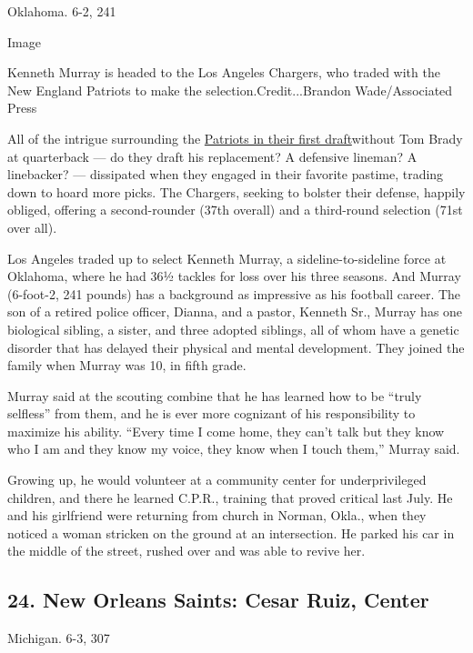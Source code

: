 Oklahoma. 6-2, 241

Image

Kenneth Murray is headed to the Los Angeles Chargers, who traded with
the New England Patriots to make the selection.Credit...Brandon
Wade/Associated Press

All of the intrigue surrounding the
\href{https://www.nytimes3xbfgragh.onion/2020/04/22/sports/football/patriots-nfl-draft-bill-belichick.html}{Patriots
in their first draft}without Tom Brady at quarterback --- do they draft
his replacement? A defensive lineman? A linebacker? --- dissipated when
they engaged in their favorite pastime, trading down to hoard more
picks. The Chargers, seeking to bolster their defense, happily obliged,
offering a second-rounder (37th overall) and a third-round selection
(71st over all).

Los Angeles traded up to select Kenneth Murray, a sideline-to-sideline
force at Oklahoma, where he had 36½ tackles for loss over his three
seasons. And Murray (6-foot-2, 241 pounds) has a background as
impressive as his football career. The son of a retired police officer,
Dianna, and a pastor, Kenneth Sr., Murray has one biological sibling, a
sister, and three adopted siblings, all of whom have a genetic disorder
that has delayed their physical and mental development. They joined the
family when Murray was 10, in fifth grade.

Murray said at the scouting combine that he has learned how to be
``truly selfless'' from them, and he is ever more cognizant of his
responsibility to maximize his ability. ``Every time I come home, they
can't talk but they know who I am and they know my voice, they know when
I touch them,'' Murray said.

Growing up, he would volunteer at a community center for underprivileged
children, and there he learned C.P.R., training that proved critical
last July. He and his girlfriend were returning from church in Norman,
Okla., when they noticed a woman stricken on the ground at an
intersection. He parked his car in the middle of the street, rushed over
and was able to revive her.

\hypertarget{24-new-orleans-saints-cesar-ruiz-center}{%
\subsection{24. New Orleans Saints: Cesar Ruiz,
Center}\label{24-new-orleans-saints-cesar-ruiz-center}}

Michigan. 6-3, 307

